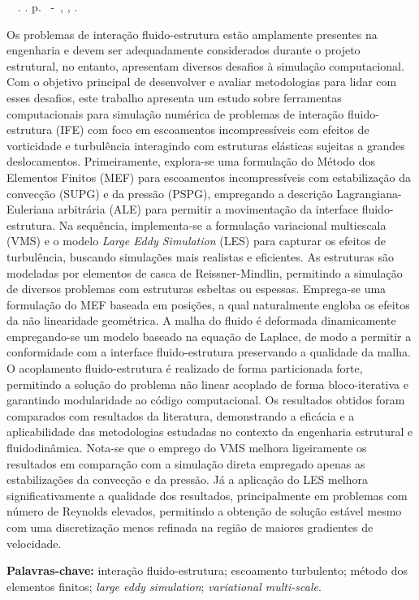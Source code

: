 \setlength{\absparsep}{18pt} %
\begin{resumo}
	\begin{flushleft}
		\setlength{\absparsep}{0pt} %
		\SingleSpacing
		\imprimirautorabr~~\textbf{\imprimirtituloresumo}.	\imprimirdata. \pageref{LastPage} p.
		\imprimirtipotrabalho~-~\imprimirinstituicao, \imprimirlocal, \imprimirdata.
	\end{flushleft}
	\OnehalfSpacing

	Os problemas de interação fluido-estrutura estão amplamente presentes na engenharia e devem ser adequadamente considerados durante o projeto estrutural, no entanto, apresentam diversos desafios à simulação computacional. Com o objetivo principal de desenvolver e avaliar metodologias para lidar com esses desafios, este trabalho apresenta um estudo sobre ferramentas computacionais para simulação numérica de problemas de interação fluido-estrutura (IFE) com foco em escoamentos incompressíveis com efeitos de vorticidade e turbulência interagindo com estruturas elásticas sujeitas a grandes deslocamentos. Primeiramente, explora-se uma formulação do Método dos Elementos Finitos (MEF) para escoamentos incompressíveis com estabilização da convecção (SUPG) e da pressão (PSPG), empregando a descrição Lagrangiana-Euleriana arbitrária (ALE) para permitir a movimentação da interface fluido-estrutura. Na sequência, implementa-se a formulação variacional multiescala (VMS) e o modelo \textit{Large Eddy Simulation} (LES) para capturar os efeitos de turbulência, buscando simulações mais realistas e eficientes. As estruturas são modeladas por elementos de casca de Reissner-Mindlin, permitindo a simulação de diversos problemas com estruturas esbeltas ou espessas. Emprega-se uma formulação do MEF baseada em posições, a qual naturalmente engloba os efeitos da não linearidade geométrica. A malha do fluido é deformada dinamicamente empregando-se um modelo baseado na equação de Laplace, de modo a permitir a conformidade com a interface fluido-estrutura preservando a qualidade da malha. O acoplamento fluido-estrutura é realizado de forma particionada forte, permitindo a solução do problema não linear acoplado de forma bloco-iterativa e garantindo modularidade ao código computacional. Os resultados obtidos foram comparados com resultados da literatura, demonstrando a eficácia e a aplicabilidade das metodologias estudadas no contexto da engenharia estrutural e fluidodinâmica. Nota-se que o emprego do VMS melhora ligeiramente os resultados em comparação com a simulação direta empregado apenas as estabilizações da convecção e da pressão. Já a aplicação do LES melhora significativamente a qualidade dos resultados, principalmente em problemas com número de Reynolds elevados, permitindo a obtenção de solução estável mesmo com uma discretização menos refinada na região de maiores gradientes de velocidade.

	\textbf{Palavras-chave:} interação fluido-estrutura; escoamento turbulento; método dos elementos finitos; \textit{large eddy simulation}; \textit{variational multi-scale}.
\end{resumo}